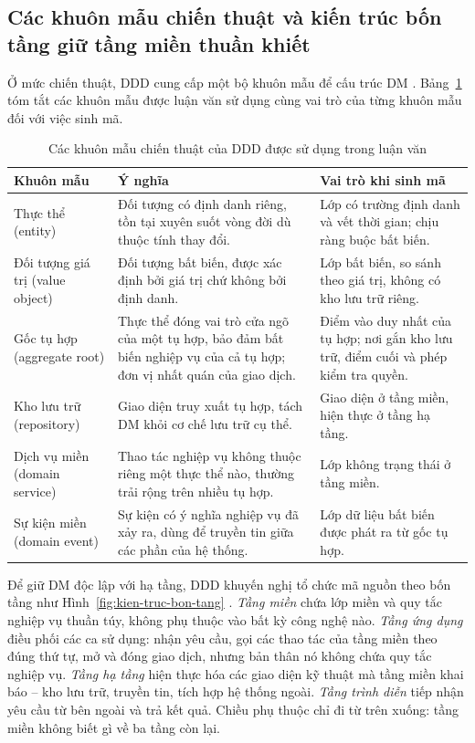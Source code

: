 \subsection{Các khuôn mẫu chiến thuật và kiến trúc bốn tầng giữ tầng miền thuần khiết}

Ở mức chiến thuật, DDD cung cấp một bộ khuôn mẫu để cấu trúc DM \cite{evans2003,vernon2013}. Bảng~\ref{tab:khuon-mau-ddd} tóm tắt các khuôn mẫu được luận văn sử dụng cùng vai trò của từng khuôn mẫu đối với việc sinh mã.

\begin{table}[htbp]
\centering
\caption{Các khuôn mẫu chiến thuật của DDD được sử dụng trong luận văn}
\label{tab:khuon-mau-ddd}
\small
\begin{tabularx}{\textwidth}{@{}lXX@{}}
\toprule
\textbf{Khuôn mẫu} & \textbf{Ý nghĩa} & \textbf{Vai trò khi sinh mã} \\
\midrule
Thực thể (entity) & Đối tượng có định danh riêng, tồn tại xuyên suốt vòng đời dù thuộc tính thay đổi. & Lớp có trường định danh và vết thời gian; chịu ràng buộc bất biến. \\
Đối tượng giá trị (value object) & Đối tượng bất biến, được xác định bởi giá trị chứ không bởi định danh. & Lớp bất biến, so sánh theo giá trị, không có kho lưu trữ riêng. \\
Gốc tụ hợp (aggregate root) & Thực thể đóng vai trò cửa ngõ của một tụ hợp, bảo đảm bất biến nghiệp vụ của cả tụ hợp; đơn vị nhất quán của giao dịch. & Điểm vào duy nhất của tụ hợp; nơi gắn kho lưu trữ, điểm cuối và phép kiểm tra quyền. \\
Kho lưu trữ (repository) & Giao diện truy xuất tụ hợp, tách DM khỏi cơ chế lưu trữ cụ thể. & Giao diện ở tầng miền, hiện thực ở tầng hạ tầng. \\
Dịch vụ miền (domain service) & Thao tác nghiệp vụ không thuộc riêng một thực thể nào, thường trải rộng trên nhiều tụ hợp. & Lớp không trạng thái ở tầng miền. \\
Sự kiện miền (domain event) & Sự kiện có ý nghĩa nghiệp vụ đã xảy ra, dùng để truyền tin giữa các phần của hệ thống. & Lớp dữ liệu bất biến được phát ra từ gốc tụ hợp. \\
\bottomrule
\end{tabularx}
\end{table}

Để giữ DM độc lập với hạ tầng, DDD khuyến nghị tổ chức mã nguồn theo bốn tầng như Hình~\ref{fig:kien-truc-bon-tang} \cite{evans2003,vernon2013}. \emph{Tầng miền} chứa lớp miền và quy tắc nghiệp vụ thuần túy, không phụ thuộc vào bất kỳ công nghệ nào. \emph{Tầng ứng dụng} điều phối các ca sử dụng: nhận yêu cầu, gọi các thao tác của tầng miền theo đúng thứ tự, mở và đóng giao dịch, nhưng bản thân nó không chứa quy tắc nghiệp vụ. \emph{Tầng hạ tầng} hiện thực hóa các giao diện kỹ thuật mà tầng miền khai báo -- kho lưu trữ, truyền tin, tích hợp hệ thống ngoài. \emph{Tầng trình diễn} tiếp nhận yêu cầu từ bên ngoài và trả kết quả. Chiều phụ thuộc chỉ đi từ trên xuống: tầng miền không biết gì về ba tầng còn lại.

